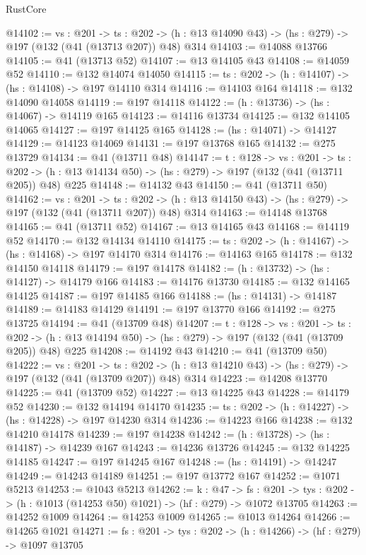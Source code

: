 \begin{lexlean}{RustCore}
\begin{coremodule}
@14102 := {vs : @201} ->
  {ts : @202} -> (h : @13 @14090 @43) -> (hs : @279) -> @197 (@132 (@41 (@13713 @207)) @48) @314
@14103 := @14088 @13766
@14105 := @41 (@13713 @52)
@14107 := @13 @14105 @43
@14108 := @14059 @52
@14110 := @132 @14074 @14050
@14115 := {ts : @202} -> (h : @14107) -> (hs : @14108) -> @197 @14110 @314
@14116 := @14103 @164
@14118 := @132 @14090 @14058
@14119 := @197 @14118
@14122 := (h : @13736) -> (hs : @14067) -> @14119 @165
@14123 := @14116 @13734
@14125 := @132 @14105 @14065
@14127 := @197 @14125 @165
@14128 := (hs : @14071) -> @14127
@14129 := @14123 @14069
@14131 := @197 @13768 @165
@14132 := @275 @13729
@14134 := @41 (@13711 @48)
@14147 := {t : @128} ->
  {vs : @201} ->
  {ts : @202} -> (h : @13 @14134 @50) -> (hs : @279) -> @197 (@132 (@41 (@13711 @205)) @48) @225
@14148 := @14132 @43
@14150 := @41 (@13711 @50)
@14162 := {vs : @201} ->
  {ts : @202} -> (h : @13 @14150 @43) -> (hs : @279) -> @197 (@132 (@41 (@13711 @207)) @48) @314
@14163 := @14148 @13768
@14165 := @41 (@13711 @52)
@14167 := @13 @14165 @43
@14168 := @14119 @52
@14170 := @132 @14134 @14110
@14175 := {ts : @202} -> (h : @14167) -> (hs : @14168) -> @197 @14170 @314
@14176 := @14163 @165
@14178 := @132 @14150 @14118
@14179 := @197 @14178
@14182 := (h : @13732) -> (hs : @14127) -> @14179 @166
@14183 := @14176 @13730
@14185 := @132 @14165 @14125
@14187 := @197 @14185 @166
@14188 := (hs : @14131) -> @14187
@14189 := @14183 @14129
@14191 := @197 @13770 @166
@14192 := @275 @13725
@14194 := @41 (@13709 @48)
@14207 := {t : @128} ->
  {vs : @201} ->
  {ts : @202} -> (h : @13 @14194 @50) -> (hs : @279) -> @197 (@132 (@41 (@13709 @205)) @48) @225
@14208 := @14192 @43
@14210 := @41 (@13709 @50)
@14222 := {vs : @201} ->
  {ts : @202} -> (h : @13 @14210 @43) -> (hs : @279) -> @197 (@132 (@41 (@13709 @207)) @48) @314
@14223 := @14208 @13770
@14225 := @41 (@13709 @52)
@14227 := @13 @14225 @43
@14228 := @14179 @52
@14230 := @132 @14194 @14170
@14235 := {ts : @202} -> (h : @14227) -> (hs : @14228) -> @197 @14230 @314
@14236 := @14223 @166
@14238 := @132 @14210 @14178
@14239 := @197 @14238
@14242 := (h : @13728) -> (hs : @14187) -> @14239 @167
@14243 := @14236 @13726
@14245 := @132 @14225 @14185
@14247 := @197 @14245 @167
@14248 := (hs : @14191) -> @14247
@14249 := @14243 @14189
@14251 := @197 @13772 @167
@14252 := @1071 @5213
@14253 := @1043 @5213
@14262 := {k : @47} ->
  {fs : @201} -> {tys : @202} -> (h : @1013 (@14253 @50) @1021) -> (hf : @279) -> @1072 @13705
@14263 := @14252 @1009
@14264 := @14253 @1009
@14265 := @1013 @14264
@14266 := @14265 @1021
@14271 := {fs : @201} -> {tys : @202} -> (h : @14266) -> (hf : @279) -> @1097 @13705

\end{coremodule}
\end{lexlean}
